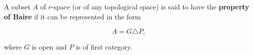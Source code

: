 A subset $A$ of $r$-space (or of any topological space) is said to have the \textbf{property of Baire} if it can be represented in the form

$$A = G \triangle P,$$

where $G$ is open and $P$ is of first category.
